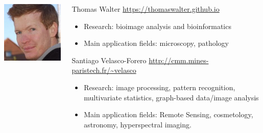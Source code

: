 \documentclass[xcolor=pdftex,dvipsnames,table,mathserif]{beamer}
\begin{document}
{\begin{columns}
\begin{column}{.2\textwidth}
\vspace{2em}
    \includegraphics[width=\textwidth]{ed.jpg}

  \end{column}
  \begin{column}{.8\textwidth}

    \begin{block}{Thomas Walter \hfill \scriptsize{\url{https://thomaswalter.github.io}}}
      \scriptsize{
    \begin{itemize}
    \item Research: bioimage analysis and bioinformatics
    \item Main application fields: microscopy, pathology
    \end{itemize}
    }
  \end{block}

  \begin{block}{Santiago Velasco-Forero  \hfill \scriptsize{\url{http://cmm.mines-paristech.fr/\~velasco}}}
      \scriptsize{
    \begin{itemize}
    \item Research: image processing, pattern recognition, multivariate statistics, graph-based data/image analysis
    \item Main application fields: Remote Sensing, cosmetology, astronomy, hyperspectral imaging.
    \end{itemize}
    }
  \end{block}


\end{column}
\end{columns}}
\end{document}
